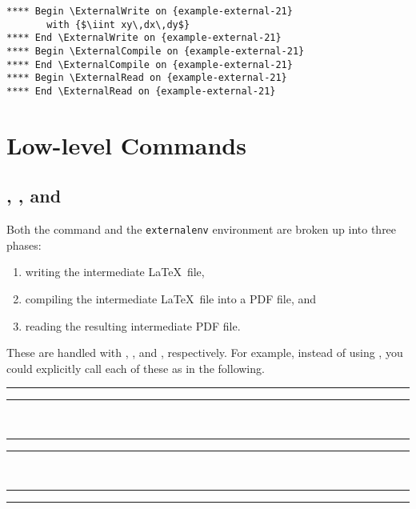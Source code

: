 \documentclass[10pt]{ltxdoc}
\newcommand{\env}[1]{\texttt{#1}}
\def\sz{%
  \rule{0.2em}{7pt}%
  \llap{\rule[8pt]{0.2em}{2pt}}%
}
\begin{document}
\begin{tcolorbox}
\begin{verbatim}
**** Begin \ExternalWrite on {example-external-21}
       with {$\iint xy\,dx\,dy$}
**** End \ExternalWrite on {example-external-21}
**** Begin \ExternalCompile on {example-external-21}
**** End \ExternalCompile on {example-external-21}
**** Begin \ExternalRead on {example-external-21}
**** End \ExternalRead on {example-external-21}
\end{verbatim}
\end{tcolorbox}

\section{Low-level Commands}
\label{sec:Low-level Commands}

\subsection{, , and }
\label{subsec:ExternalWrite, ExternalCompile, and ExternalRead}




Both the  command and the \env{externalenv} environment
are broken up into three phases:
\begin{enumerate}
\item writing the intermediate \LaTeX\ file,
\item compiling the intermediate \LaTeX\ file into a PDF file, and
\item reading the resulting intermediate PDF file.
\end{enumerate}

These are handled with , , and
, respectively.
For example, instead of using , you could explicitly call
each of these as in the following.

\begin{tcblisting}{}
\sz
{}%
\sz~%
\sz\ExternalCompile[file=example-external-separate]\sz~%
\sz\ExternalRead[file=example-external-separate]\sz
\end{tcblisting}
\end{document}
